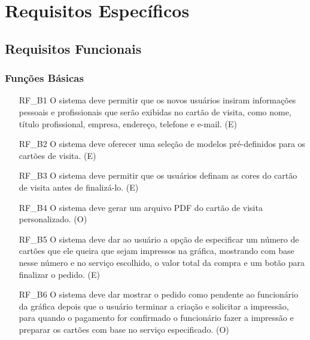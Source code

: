 \section{Requisitos Específicos}

\subsection{Requisitos Funcionais}

\subsubsection{Funções Básicas}
\begin{itemize}
    \item[RF\_B1] O sistema deve permitir que os novos usuários insiram informações pessoais e profissionais que serão exibidas no cartão de visita, como nome, título profissional, empresa, endereço, telefone e e-mail. (E)
    \item[RF\_B2] O sistema deve oferecer uma seleção de modelos pré-definidos para os cartões de visita. (E)
    \item[RF\_B3] O sistema deve permitir que os usuários definam as cores do cartão de visita antes de finalizá-lo. (E)
    \item[RF\_B4] O sistema deve gerar um arquivo PDF do cartão de visita personalizado. (O)
    \item[RF\_B5] O sistema deve dar ao usuário a opção de especificar um número de cartões que ele queira que sejam impressos na gráfica, mostrando com base nesse número e no serviço escolhido, o valor total da compra e um botão para finalizar o pedido. (E)
    \item[RF\_B6] O sistema deve dar mostrar o pedido como pendente ao funcionário da gráfica depois que o usuário terminar a criação e solicitar a impressão, para quando o pagamento for confirmado o funcionário fazer a impressão e preparar os cartões com base no serviço especificado. (O)
\end{itemize}

